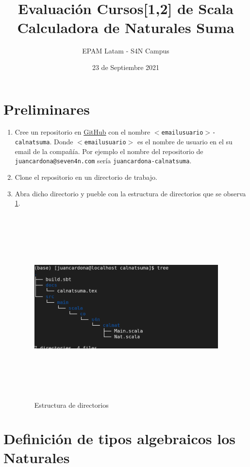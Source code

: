 \documentclass[12pt]{article}
\title{Evaluación Cursos[1,2] de Scala\\Calculadora de Naturales Suma}
\date{23 de Septiembre 2021}
\author{EPAM Latam - S4N Campus}
\begin{document}
\maketitle

\section{Preliminares}
\label{sec:preliminares}

\begin{enumerate}
\item Cree un repositorio en \href{https://github.com}{GitHub} con el nombre \texttt{$<$emailusuario$>$-calnatsuma}. Donde \texttt{$<$emailusuario$>$} es el nombre de usuario en el su email de la compañía. Por ejemplo el nombre del repositorio de \texttt{juancardona@seven4n.com} sería \texttt{juancardona-calnatsuma}.
\item Clone el repositorio en un directorio de trabajo.
\item Abra dicho directorio y pueble con la estructura de directorios que se observa \ref{fig:dir}.
  \begin{figure}[h]
    \centering
    \includegraphics[width=10cm,height=10cm]{../../../imagenes/jerarquia-calnatsuma.png}
    \caption{Estructura de directorios}
    \label{fig:dir}
  \end{figure}

\end{enumerate}

\section{Definición de tipos algebraicos los Naturales}
\label{sec:definicio-de-tipos}
\end{document}
